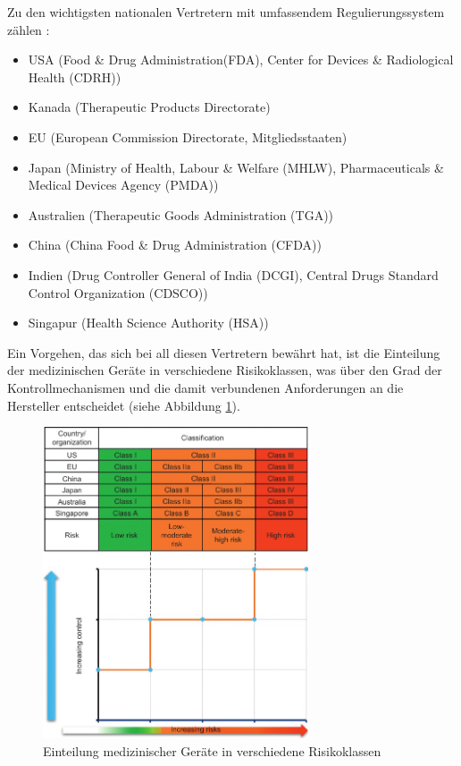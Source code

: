 \documentclass[a4paper,12pt]{report}
\begin{document}
Zu den wichtigsten nationalen Vertretern mit umfassendem Regulierungssystem zählen \citep[vgl.][S. 14]{Ramakrishna2015}:
\begin{itemize}
\item USA (Food \& Drug Administration(FDA), Center for Devices \& Radiological Health (CDRH))
\item Kanada (Therapeutic Products Directorate)
\item EU (European Commission Directorate, Mitgliedsstaaten)
\item Japan (Ministry of Health, Labour \& Welfare (MHLW), Pharmaceuticals \& Medical Devices Agency (PMDA))
\item Australien (Therapeutic Goods Administration (TGA))
\item China (China Food \& Drug Administration (CFDA))
\item Indien (Drug Controller General of India (DCGI), Central Drugs Standard Control Organization (CDSCO))
\item Singapur (Health Science Authority (HSA))
\end{itemize}

Ein Vorgehen, das sich bei all diesen Vertretern bewährt hat, ist die Einteilung der medizinischen Geräte in verschiedene Risikoklassen, was über den Grad der Kontrollmechanismen und die damit verbundenen Anforderungen an die Hersteller entscheidet (siehe Abbildung \ref{classification_meddev}).
\begin{figure}[ht]
\centering
\includegraphics[width=0.7\textwidth]{Images/classification_meddev}
\caption[Einteilung medizinischer Geräte in verschiedene Risikoklassen]{Einteilung medizinischer Geräte in verschiedene Risikoklassen \citep[S. 22]{Ramakrishna2015}}
\label{classification_meddev}
\end{figure}
\end{document}
